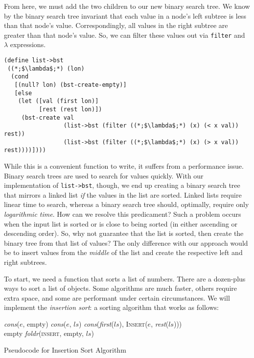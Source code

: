 From here, we must add the two children to our new binary search tree. We know by the binary search tree invariant that each value in a node's left subtree is less than that node's value. Correspondingly, all values in the right subtree are greater than that node's value. So, we can filter these values out via \texttt{filter} and $\lambda$ expressions.

\begin{cl}[]{}\begin{lstlisting}[language=MyScheme]
(define list->bst
 ((*;$\lambda$;*) (lon)
  (cond
   [(null? lon) (bst-create-empty)]
   [else 
    (let ([val (first lon)]
          [rest (rest lon)])
     (bst-create val
                 (list->bst (filter ((*;$\lambda$;*) (x) (< x val)) rest))
                 (list->bst (filter ((*;$\lambda$;*) (x) (> x val)) rest))))])))
\end{lstlisting}\end{cl}

While this is a convenient function to write, it suffers from a performance issue. Binary search trees are used to search for values quickly. With our implementation of \texttt{list->bst}, though, we end up creating a binary search tree that mirrors a linked list \textit{if} the values in the list are sorted. Linked lists require linear time to search, whereas a binary search tree should, optimally, require only \textit{logarithmic time}. How can we resolve this predicament? 
Such a problem occurs when the input list is sorted or is close to being sorted (in either ascending or descending order). So, why not guarantee that the list is sorted, then create the binary tree from that list of values? The only difference with our approach would be to insert values from the \textit{middle} of the list and create the respective left and right subtrees.

To start, we need a function that sorts a list of numbers. There are a dozen-plus ways to sort a list of objects. Some algorithms are much faster, others require extra space, and some are performant under certain circumstances. We will implement the \textit{insertion sort}: a sorting algorithm that works as follows:

\begin{algorithm}[H]
\begin{algorithmic}
    \State \Return \textit{cons}($e$, empty)
    \State \Return \textit{cons}($e$, $ls$)
  \Else
    \State \Return \textit{cons}(\textit{first}($ls$), \textsc{Insert}($e$, \textit{rest}($ls$)))
  \EndIf
\EndProcedure
\\

      \State \Return empty
    \Else
        \State \Return \textit{foldr}(\textsc{insert}, empty, $ls$)
    \EndIf
\EndProcedure
\end{algorithmic}
\caption{Pseudocode for Insertion Sort Algorithm}
\label{alg:pseudocodeinsertion}
\end{algorithm}

